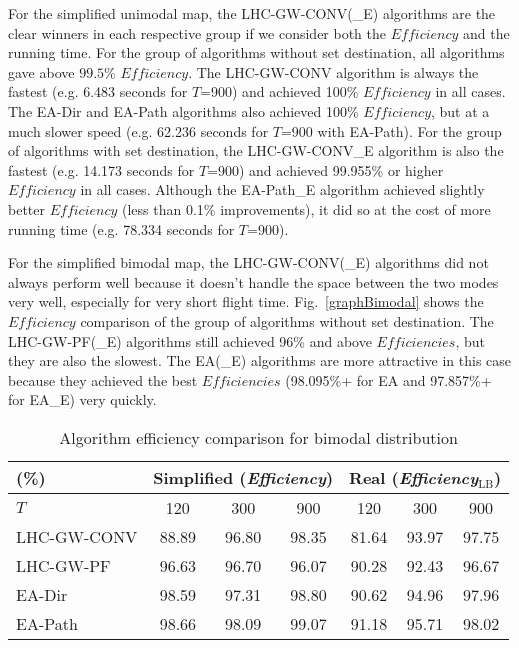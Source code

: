 \documentclass[letterpaper, 10 pt, conference]{ieeeconf}
\begin{document}
For the simplified unimodal map, the LHC-GW-CONV(\_E) algorithms are the clear winners in each respective group if we consider both the $\mathit{Efficiency}$ and the running time. For the group of algorithms without set destination, all algorithms gave above $99.5\%$ $\mathit{Efficiency}$. The LHC-GW-CONV algorithm is always the fastest  (e.g. 6.483 seconds for $T$=900) and achieved 100\% $\mathit{Efficiency}$ in all cases. The EA-Dir and EA-Path algorithms also achieved 100\% $\mathit{Efficiency}$, but at a much slower speed (e.g. 62.236 seconds for $T$=900 with EA-Path). For the group of algorithms with set destination, the LHC-GW-CONV\_E algorithm is also the fastest  (e.g. 14.173 seconds for $T$=900) and achieved 99.955\% or higher $\mathit{Efficiency}$ in all cases. Although the EA-Path\_E algorithm achieved slightly better $\mathit{Efficiency}$ (less than 0.1\% improvements), it did so at the cost of more running time (e.g. 78.334 seconds for $T$=900).

For the simplified bimodal map, the LHC-GW-CONV(\_E) algorithms did not always perform well because it doesn't handle the space between the two modes very well, especially for very short flight time. Fig.~\ref{graphBimodal} shows the $\mathit{Efficiency}$ comparison of the group of algorithms without set destination. The LHC-GW-PF(\_E) algorithms still achieved 96\% and above $\mathit{Efficiencies}$, but they are also the slowest. The EA(\_E) algorithms are more attractive in this case because they achieved the best $\mathit{Efficiencies}$ (98.095\%+ for EA and 97.857\%+ for EA\_E) very quickly.

\begin{table}
	\centering
		\begin{tabular}
			{|l|c|c|c|c|c|c|}
			\hline
			(\%) & \multicolumn{3}{|c|}{Simplified ({\it{Efficiency}})} & \multicolumn{3}{|c|}{Real ({\it{Efficiency$_\textrm{LB}$}})} \\
			\hline
			$T$ & 120 & 300 & 900	& 120 & 300 & 900 \\
			\hline
			LHC-GW-CONV & 88.89 & 96.80 & 98.35 & 81.64 & 93.97 & 97.75 \\
			\hline			
			LHC-GW-PF	& 96.63 & 96.70 & 96.07 & 90.28 & 92.43 & 96.67 \\ 
			\hline
			EA-Dir & 98.59 & 97.31 & 98.80 & 90.62 & 94.96 & 97.96 \\
			\hline
			EA-Path & 98.66 & 98.09 & 99.07 & 91.18 & 95.71 & 98.02 \\
			\hline
		\end{tabular}
\caption{Algorithm efficiency comparison for bimodal distribution}
\label{EBimodalSimplified}
\vspace*{-5ex}
\end{table}
\end{document}
